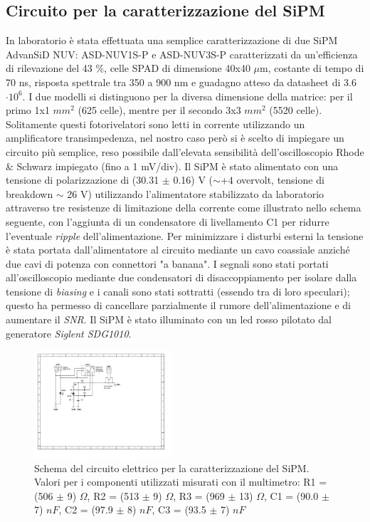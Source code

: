 \documentclass[journal]{IEEEtran}
\begin{document}
\subsection{Circuito per la caratterizzazione del SiPM}
In laboratorio è stata effettuata una semplice caratterizzazione di due SiPM AdvanSiD NUV: ASD-NUV1S-P e ASD-NUV3S-P \cite{I} caratterizzati da un'efficienza di rilevazione del 43 \%, celle SPAD di dimensione 40x40 $\mu$m, costante di tempo di 70 ns, risposta spettrale tra 350 a 900 nm e guadagno atteso da datasheet di 3.6 $\cdot 10^6$. I due modelli si distinguono per la diversa dimensione della matrice: per il primo 1x1 $mm^2$ (625 celle), mentre per il secondo 3x3 $mm^2$ (5520 celle). Solitamente questi fotorivelatori sono letti in corrente utilizzando un amplificatore transimpedenza, nel nostro caso però si è scelto di impiegare un circuito più semplice, reso possibile dall'elevata sensibilità dell'oscilloscopio Rhode & Schwarz impiegato (fino a 1 mV/div). Il SiPM è stato alimentato con una tensione di polarizzazione di (30.31 $\pm$ 0.16) V ($\sim +4$ overvolt, tensione di breakdown $\sim$ 26 V) utilizzando l'alimentatore stabilizzato da laboratorio attraverso tre resistenze di limitazione della corrente come illustrato nello schema seguente, con l'aggiunta di un condensatore di livellamento C1 per ridurre l'eventuale \textit{ripple} dell'alimentazione. Per minimizzare i disturbi esterni la tensione è stata portata dall'alimentatore al circuito mediante un cavo coassiale anziché due cavi di potenza con connettori "a banana". I segnali sono stati portati all'oscilloscopio mediante due condensatori di disaccoppiamento per isolare dalla tensione di \textit{biasing} e i canali sono stati sottratti (essendo tra di loro speculari); questo ha permesso di cancellare parzialmente il rumore dell'alimentazione e di aumentare il \textit{SNR}. Il SiPM è stato illuminato con un led rosso pilotato dal generatore \textit{Siglent SDG1010}.

\begin{figure}[H]%
\begin{center}
\includegraphics[width=0.46\textwidth]{sch-simulations/output/SiPM.pdf}
\caption{Schema del circuito elettrico per la caratterizzazione del SiPM. Valori per i componenti utilizzati misurati con il multimetro: R1 = (506 $\pm$ 9) $\Omega$, R2 = (513 $\pm$ 9) $\Omega$, R3 = (969 $\pm$ 13) $\Omega$, C1 = (90.0 $\pm$ 7) $nF$, C2 = (97.9 $\pm$ 8) $nF$, C3 = (93.5 $\pm$ 7) $nF$}
\label{fig:oscilloscope}
\end{center}
\end{figure}
\end{document}

